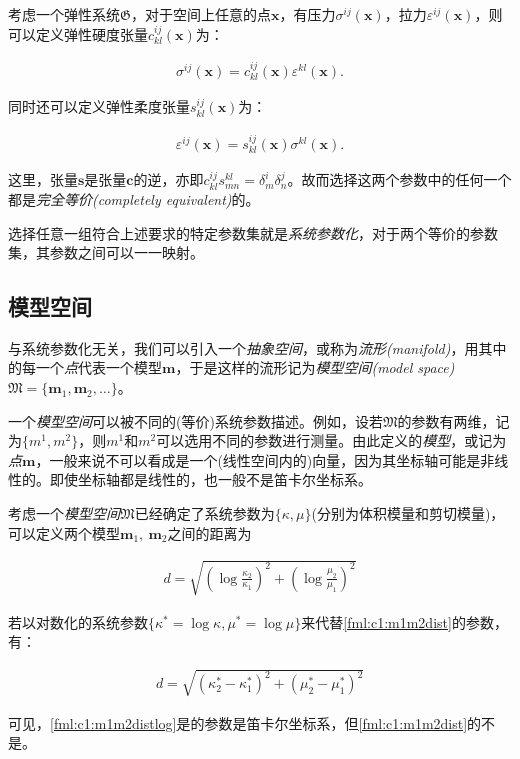 \begin{example}
  考虑一个弹性系统$\mathfrak{G}$，对于空间上任意的点$\mathbf{x}$，有压力$\sigma^{ij}(\mathbf{x})$，拉力$\varepsilon^{ij}(\mathbf{x})$，则可以定义弹性硬度张量$c^{ij}_{kl}(\mathbf{x})$为：
  
  \begin{align} \label{fml:c1:stiffness}
    \sigma^{ij}(\mathbf{x}) = c^{ij}_{kl}(\mathbf{x}) \varepsilon^{kl}(\mathbf{x}).
  \end{align}
  
  同时还可以定义弹性柔度张量$s^{ij}_{kl}(\mathbf{x})$为：
  
  \begin{align} \label{fml:c1:compliance}
    \varepsilon^{ij}(\mathbf{x}) = s^{ij}_{kl}(\mathbf{x}) \sigma^{kl}(\mathbf{x}).
  \end{align}
  
  这里，张量$\mathbf{s}$是张量$\mathbf{c}$的逆，亦即$c^{ij}_{kl}s^{kl}_{mn}=\delta^{i}_{m}\delta^{j}_{n}$。故而选择这两个参数中的任何一个都是\emph{完全等价(completely equivalent)}的。
\end{example}

选择任意一组符合上述要求的特定参数集就是\emph{系统参数化}，对于两个等价的参数集，其参数之间可以一一映射。

\subsection{模型空间}

与系统参数化无关，我们可以引入一个\emph{抽象空间}，或称为\emph{流形(manifold)}，用其中的每一个\emph{点}代表一个模型$\mathbf{m}$，于是这样的流形记为\emph{模型空间(model space)}~$\mathfrak{M}=\{\mathbf{m}_1,\mathbf{m}_2,\ldots\}$。

一个\emph{模型空间}可以被不同的(等价)系统参数描述。例如，设若$\mathfrak{M}$的参数有两维，记为$\{m^1, m^2\}$，则$m^1$和$m^2$可以选用不同的参数进行测量。由此定义的\emph{模型}，或记为\emph{点}$\mathbf{m}$，一般来说不可以看成是一个(线性空间内的)向量，因为其坐标轴可能是非线性的。即使坐标轴都是线性的，也一般不是笛卡尔坐标系。

\begin{example} \label{exp:c1:dist}
  考虑一个\emph{模型空间}$\mathfrak{M}$已经确定了系统参数为$\{\kappa, \mu\}$(分别为体积模量和剪切模量)，可以定义两个模型$\mathbf{m}_1,~\mathbf{m}_2$之间的距离为
  
  \begin{align} \label{fml:c1:m1m2dist}
    d = \sqrt{{\left(\log \frac{\kappa_2}{\kappa_1}\right)}^2+{\left(\log \frac{\mu_2}{\mu_1}\right)}^2}
  \end{align}
  
  若以对数化的系统参数$\{\kappa^{\ast}=\log \kappa, \mu^{\ast}=\log \mu\}$来代替\eqref{fml:c1:m1m2dist}的参数，有：
  
  \begin{align} \label{fml:c1:m1m2distlog}
    d = \sqrt{{\left(\kappa^{\ast}_2 - \kappa^{\ast}_1\right)}^2+{\left(\mu^{\ast}_2 - \mu^{\ast}_1\right)}^2}
  \end{align}
  
  可见，\eqref{fml:c1:m1m2distlog}是的参数是笛卡尔坐标系，但\eqref{fml:c1:m1m2dist}的不是。
\end{example}

